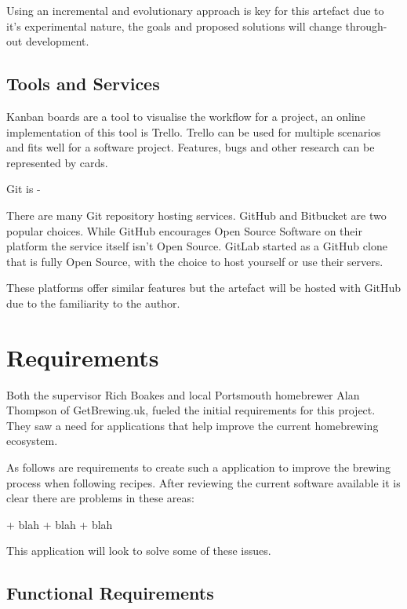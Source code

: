 Using an incremental and evolutionary approach is key for this artefact due to it's experimental nature, the goals and proposed solutions will change through-out development.

\subsection{Tools and Services} \label{a-d--methodology--tools}

Kanban boards are a tool to visualise the workflow for a project, an online implementation of this tool is Trello. Trello can be used for multiple scenarios and fits well for a software project. Features, bugs and other research can be represented by cards. \cite{trello}

Git is -

There are many Git repository hosting services. GitHub and Bitbucket are two popular choices. While GitHub encourages Open Source Software on their platform the service itself isn't Open Source. \cite{github} GitLab started as a GitHub clone that is fully Open Source, with the choice to host yourself or use their servers. %

These platforms offer similar features but the artefact will be hosted with GitHub due to the familiarity to the author.

\section{Requirements} \label{a-d--requirements}

Both the supervisor Rich Boakes and local Portsmouth homebrewer Alan Thompson of GetBrewing.uk, fueled the initial requirements for this project. They saw a need for applications that help improve the current homebrewing ecosystem.

As follows are requirements to create such a application to improve the brewing process when following recipes. After reviewing the current software available it is clear there are problems in these areas:

+ blah
+ blah
+ blah

This application will look to solve some of these issues.


\subsection{Functional Requirements} \label{a-d--requirements--functional}

